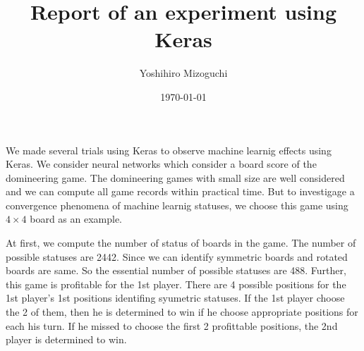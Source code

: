 \documentclass{article}
\title{Report of an experiment using Keras}
\author{Yoshihiro Mizoguchi}
\date{\today \currenttime}
\begin{document}
\maketitle

We made several trials using Keras to observe machine learnig
effects using Keras.
We consider neural networks which consider a board score
of the domineering game.
The domineering games with small size are well considered
and we can compute all game records within practical time.
But to investigage a convergence phenomena of machine learnig
statuses, we choose this game using $4 \times 4$ board as an example.

At first, we compute the number of status of boards in the game.
The number of possible statuses are 2442.
Since we can identify symmetric boards and rotated boards are same.
So the essential number of possible statuses are 488.
Further, this game is profitable for the 1st player.
There are 4 possible positions for the 1st player's 1st positions
identifing syumetric statuses.
If the 1st player choose the 2 of them, then he is determined to win
if he choose appropriate positions for each his turn.
If he missed to choose the first 2 profittable positions,
the 2nd player is determined to win.
\end{document}
